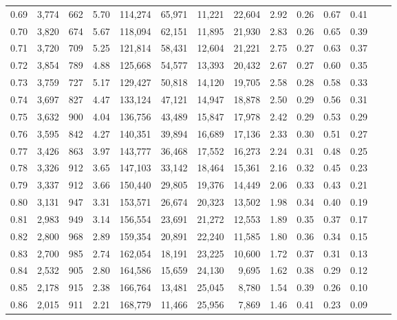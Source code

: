 \begin{tabular}{rrrrrrrrrrrrrr}
0.69 &  3,774 &  662 &    5.70 &  114,274 &   65,971 &  11,221 &  22,604 &  2.92 &  0.26 &  0.67 &      0.41 \\
0.70 &  3,820 &  674 &    5.67 &  118,094 &   62,151 &  11,895 &  21,930 &  2.83 &  0.26 &  0.65 &      0.39 \\
0.71 &  3,720 &  709 &    5.25 &  121,814 &   58,431 &  12,604 &  21,221 &  2.75 &  0.27 &  0.63 &      0.37 \\
0.72 &  3,854 &  789 &    4.88 &  125,668 &   54,577 &  13,393 &  20,432 &  2.67 &  0.27 &  0.60 &      0.35 \\
0.73 &  3,759 &  727 &    5.17 &  129,427 &   50,818 &  14,120 &  19,705 &  2.58 &  0.28 &  0.58 &      0.33 \\
0.74 &  3,697 &  827 &    4.47 &  133,124 &   47,121 &  14,947 &  18,878 &  2.50 &  0.29 &  0.56 &      0.31 \\
0.75 &  3,632 &  900 &    4.04 &  136,756 &   43,489 &  15,847 &  17,978 &  2.42 &  0.29 &  0.53 &      0.29 \\
0.76 &  3,595 &  842 &    4.27 &  140,351 &   39,894 &  16,689 &  17,136 &  2.33 &  0.30 &  0.51 &      0.27 \\
0.77 &  3,426 &  863 &    3.97 &  143,777 &   36,468 &  17,552 &  16,273 &  2.24 &  0.31 &  0.48 &      0.25 \\
0.78 &  3,326 &  912 &    3.65 &  147,103 &   33,142 &  18,464 &  15,361 &  2.16 &  0.32 &  0.45 &      0.23 \\
0.79 &  3,337 &  912 &    3.66 &  150,440 &   29,805 &  19,376 &  14,449 &  2.06 &  0.33 &  0.43 &      0.21 \\
0.80 &  3,131 &  947 &    3.31 &  153,571 &   26,674 &  20,323 &  13,502 &  1.98 &  0.34 &  0.40 &      0.19 \\
0.81 &  2,983 &  949 &    3.14 &  156,554 &   23,691 &  21,272 &  12,553 &  1.89 &  0.35 &  0.37 &      0.17 \\
0.82 &  2,800 &  968 &    2.89 &  159,354 &   20,891 &  22,240 &  11,585 &  1.80 &  0.36 &  0.34 &      0.15 \\
0.83 &  2,700 &  985 &    2.74 &  162,054 &   18,191 &  23,225 &  10,600 &  1.72 &  0.37 &  0.31 &      0.13 \\
0.84 &  2,532 &  905 &    2.80 &  164,586 &   15,659 &  24,130 &   9,695 &  1.62 &  0.38 &  0.29 &      0.12 \\
0.85 &  2,178 &  915 &    2.38 &  166,764 &   13,481 &  25,045 &   8,780 &  1.54 &  0.39 &  0.26 &      0.10 \\
0.86 &  2,015 &  911 &    2.21 &  168,779 &   11,466 &  25,956 &   7,869 &  1.46 &  0.41 &  0.23 &      0.09 \\

\end{tabular}
